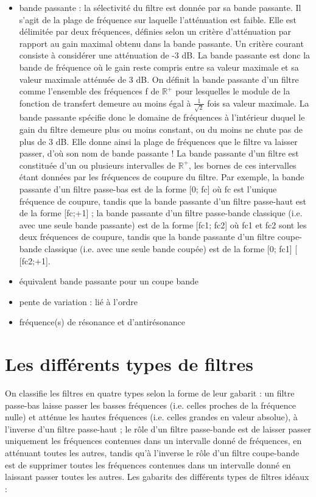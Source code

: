 \documentclass[]{report}
\begin{document}
	\begin{itemize}
		\item bande passante : la sélectivité du filtre est donnée par sa bande passante. Il s'agit de la plage de fréquence sur laquelle l'atténuation est faible. Elle est délimitée par deux fréquences, définies selon un critère d'atténuation par rapport au gain maximal obtenu dans la bande passante. Un critère courant consiste à considérer une atténuation de -3 dB. La bande passante est donc la bande de fréquence où le gain reste compris entre sa valeur maximale et sa valeur maximale atténuée de 3 dB. On définit la bande passante d’un filtre comme l’ensemble des fréquences f de $\mathbb{R}^{+}$ pour lesquelles le module de la fonction de transfert demeure au moins égal à $\frac{1}{\sqrt{2}}$ fois sa valeur maximale. 
		La bande passante spécifie donc le domaine de fréquences à l’intérieur duquel le gain du filtre demeure plus ou moins constant, ou du moins ne chute pas de plus de 3 dB. Elle donne ainsi la plage de fréquences que le filtre va laisser passer, d’où son nom de bande passante ! La bande passante d’un filtre est constituée d’un ou plusieurs intervalles de $\mathbb{R}^{+}$, les bornes de ces intervalles étant données par les fréquences de coupure du filtre. Par exemple, la bande passante d’un filtre passe-bas est de la forme [0; fc] où fc est l’unique fréquence de coupure, tandis que la bande passante d’un filtre passe-haut est de la forme [fc;+1] ; la bande passante d’un filtre passe-bande classique (i.e. avec une seule bande passante) est de la forme [fc1; fc2] où fc1 et fc2 sont les deux fréquences de coupure, tandis que la bande passante d’un filtre coupe-bande classique (i.e. avec une seule bande coupée) est de la forme [0; fc1] [ [fc2;+1].
		\item équivalent bande passante pour un coupe bande
		\item pente de variation : lié à l'ordre
		\item fréquence(s) de résonance et d'antirésonance
		
	\end{itemize}
	
	
	\section{Les différents types de filtres}
	On classifie les filtres en quatre types selon la forme de leur gabarit : un filtre passe-bas laisse passer les basses fréquences (i.e. celles proches de la fréquence nulle) et atténue les hautes fréquences (i.e. celles grandes en valeur absolue), à l’inverse d’un filtre passe-haut ; le rôle d’un filtre passe-bande est de laisser passer uniquement les fréquences contenues dans un intervalle donné de fréquences, en atténuant toutes les autres, tandis qu’à l’inverse le rôle d’un filtre coupe-bande est de supprimer toutes les fréquences contenues dans un intervalle donné en laissant passer toutes les autres. Les gabarits des différents types de filtres idéaux :
	
\end{document}
